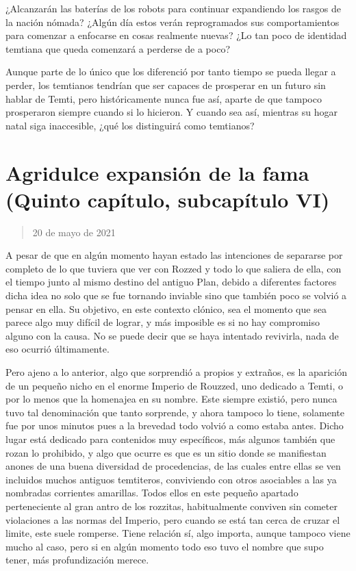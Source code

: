 \documentclass[
  spanish,
]{book}
\begin{document}
¿Alcanzarán las baterías de los robots para continuar expandiendo los rasgos de la nación nómada? ¿Algún día estos verán reprogramados sus comportamientos para comenzar a enfocarse en cosas realmente nuevas? ¿Lo tan poco de identidad temtiana que queda comenzará a perderse de a poco?

Aunque parte de lo único que los diferenció por tanto tiempo se pueda llegar a perder, los temtianos tendrían que ser capaces de prosperar en un futuro sin hablar de Temti, pero históricamente nunca fue así, aparte de que tampoco prosperaron siempre cuando si lo hicieron. Y cuando sea así, mientras su hogar natal siga inaccesible, ¿qué los distinguirá como temtianos?

\hypertarget{agridulce-expansiuxf3n-de-la-fama-quinto-capuxedtulo-subcapuxedtulo-vi}{%
\section{Agridulce expansión de la fama (Quinto capítulo, subcapítulo VI)}\label{agridulce-expansiuxf3n-de-la-fama-quinto-capuxedtulo-subcapuxedtulo-vi}}

\begin{quote}
20 de mayo de 2021
\end{quote}

A pesar de que en algún momento hayan estado las intenciones de separarse por completo de lo que tuviera que ver con Rozzed y todo lo que saliera de ella, con el tiempo junto al mismo destino del antiguo Plan, debido a diferentes factores dicha idea no solo que se fue tornando inviable sino que también poco se volvió a pensar en ella. Su objetivo, en este contexto clónico, sea el momento que sea parece algo muy difícil de lograr, y más imposible es si no hay compromiso alguno con la causa. No se puede decir que se haya intentado revivirla, nada de eso ocurrió últimamente.

Pero ajeno a lo anterior, algo que sorprendió a propios y extraños, es la aparición de un pequeño nicho en el enorme Imperio de Rouzzed, uno dedicado a Temti, o por lo menos que la homenajea en su nombre. Este siempre existió, pero nunca tuvo tal denominación que tanto sorprende, y ahora tampoco lo tiene, solamente fue por unos minutos pues a la brevedad todo volvió a como estaba antes. Dicho lugar está dedicado para contenidos muy específicos, más algunos también que rozan lo prohibido, y algo que ocurre es que es un sitio donde se manifiestan anones de una buena diversidad de procedencias, de las cuales entre ellas se ven incluidos muchos antiguos temtiteros, conviviendo con otros asociables a las ya nombradas corrientes amarillas. Todos ellos en este pequeño apartado perteneciente al gran antro de los rozzitas, habitualmente conviven sin cometer violaciones a las normas del Imperio, pero cuando se está tan cerca de cruzar el limite, este suele romperse. Tiene relación sí, algo importa, aunque tampoco viene mucho al caso, pero si en algún momento todo eso tuvo el nombre que supo tener, más profundización merece.
\end{document}
